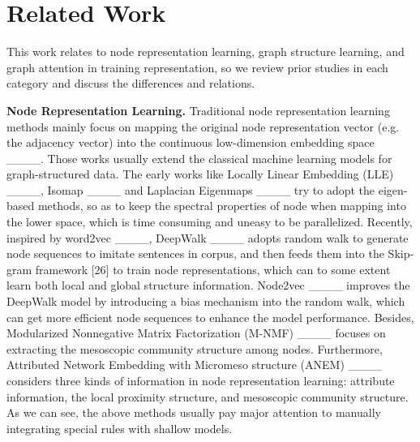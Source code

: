 \section{Related Work}
\label{sec:Literature}

This work relates to node representation learning, graph structure learning, and graph attention 
in training representation, so we review prior studies in each category and discuss the differences and relations.

\par\smallskip\noindent
\textbf{Node Representation Learning.}
Traditional node representation learning methods mainly focus on mapping the original node representation vector (e.g. the adjacency vector) into the continuous low-dimension embedding space ____. 
%
Those works usually extend the classical machine learning models for graph-structured data. 
%
The early works like Locally Linear Embedding (LLE) ____, Isomap ____ and Laplacian Eigenmaps ____ try to adopt the eigen-based methods, so as to keep the spectral properties of node when mapping into the lower space, which is time consuming and uneasy to be parallelized. 
%
Recently, inspired by word2vec ____, DeepWalk ____ adopts random walk to generate node sequences to imitate sentences in corpus, and then feeds them into the Skip-gram framework [26] to train node representations, which can to some extent learn both local and global structure information.
%
Node2vec ____ improves the DeepWalk model by introducing a bias mechanism into the random walk, which can get more efficient node sequences to enhance the model performance. 
%
Besides, Modularized Nonnegative Matrix Factorization (M-NMF) ____ focuses on extracting the mesoscopic community structure among nodes. 
%
Furthermore, Attributed Network Embedding with Micromeso structure (ANEM) ____ considers three kinds of information in node representation learning: attribute information, the local proximity structure, and mesoscopic community structure. 
%
As we can see, the above methods usually pay major attention to manually integrating special rules with shallow models.


